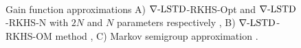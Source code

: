 \begin{figure}[htbp]
	\centering
	\mbox{
	}
	\mbox{
	}
	\mbox{
	}
	\caption[$\gradTD$-RKHS algorithms for $d=2,5,10$]{Gain function approximations A) $\gradTD$-RKHS-Opt and $\gradTD$-RKHS-N with $2N$ and $N$ parameters respectively \cite{radmey18a}, B) $\gradTD$-RKHS-OM method \cite{radmey19}, C) Markov semigroup approximation \cite{tagmeh16}.}
	\label{fig:diff_td_rkhs_coif_d2510}
\end{figure}

